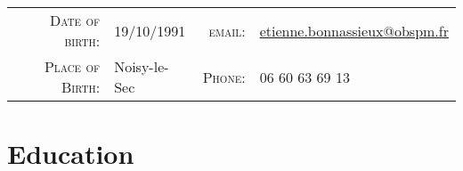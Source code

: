 \documentclass[10pt]{article} %
\begin{document}
\pagestyle{empty} %




\par{\bigskip\par} %
\begin{center}
\begin{tabular}{rl|rl}
\textsc{Date of birth:} & 19/10/1991 &
\textsc{email:} & \href{mailto:etienne.bonnassieux@obspm.fr}{etienne.bonnassieux@obspm.fr}\\
\textsc{Place of Birth:} &Noisy-le-Sec &
\textsc{Phone:} & 06 60 63 69 13
\end{tabular}
\end{center}

\vspace{0.5cm}




\section{Education}
\end{document}
